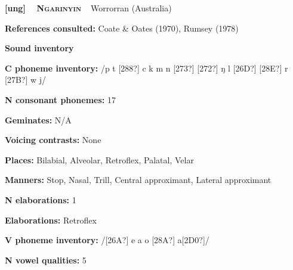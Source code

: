 \clearpage\begin{styleBody}
\textbf{[ung] }\ \ \textbf{\textsc{Ngarinyin}}\textbf{\ \ }Worrorran (Australia)
\end{styleBody}

\begin{styleBody}
\textbf{References consulted: }Coate \& Oates (1970), Rumsey (1978)
\end{styleBody}

\begin{styleBody}
\textbf{Sound inventory}
\end{styleBody}

\begin{styleBody}
\textbf{C phoneme inventory:} /p t [288?] c k m n [273?] [272?] ŋ l [26D?] [28E?] r [27B?] w j/
\end{styleBody}

\begin{styleBody}
\textbf{N consonant phonemes:} 17
\end{styleBody}

\begin{styleBody}
\textbf{Geminates:} N/A
\end{styleBody}

\begin{styleBody}
\textbf{Voicing contrasts:} None
\end{styleBody}

\begin{styleBody}
\textbf{Places:} Bilabial, Alveolar, Retroflex, Palatal, Velar
\end{styleBody}

\begin{styleBody}
\textbf{Manners:} Stop, Nasal, Trill, Central approximant, Lateral approximant
\end{styleBody}

\begin{styleBody}
\textbf{N elaborations:} 1
\end{styleBody}

\begin{styleBody}
\textbf{Elaborations:} Retroflex
\end{styleBody}

\begin{styleBody}
\textbf{V phoneme inventory:} /[26A?] e a o [28A?] a[2D0?]/
\end{styleBody}

\begin{styleBody}
\textbf{N vowel qualities:} 5
\end{styleBody}

